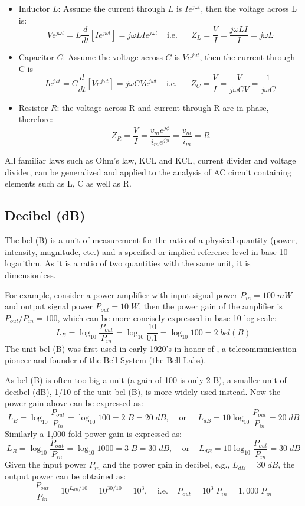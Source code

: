 \begin{itemize}
\item Inductor $L$: Assume the current through $L$ is $I e^{j\omega t}$, 
  then the voltage across L is:
  \[ V e^{j\omega t}=L\frac{d}{dt} [I e^{j\omega t}]=j\omega L I e^{j\omega t}
  \;\;\;\;\mbox{i.e.}\;\;\;\;\;\;Z_L=\frac{V}{I}=\frac{j\omega LI}{I}=j\omega L \]
\item Capacitor $C$: Assume the voltage across $C$ is $V e^{j\omega t}$, 
  then the current through C is
  \[ I e^{j\omega t}=C\frac{d}{dt} [V e^{j\omega t}]=j\omega C V e^{j\omega t}
  \;\;\;\;\mbox{i.e.}\;\;\;\;\;\;Z_C=\frac{V}{I}=\frac{V}{j\omega CV}=\frac{1}{j\omega C} \]
\item Resistor $R$: the voltage across R and current through R are in phase, therefore:
  \[ Z_R=\frac{V}{I}=\frac{v_me^{j\phi}}{i_me^{j\phi}}=\frac{v_m}{i_m}=R \]
\end{itemize}

All familiar laws such as Ohm's law, KCL and KCL, current divider and voltage
divider, can be generalized and applied to the analysis of AC circuit containing
elements such as L, C as well as R.

\subsection*{Decibel (dB)}

The bel (B) is a unit of measurement for the ratio of a physical quantity 
(power, intensity, magnitude, etc.) and a specified or implied reference 
level in base-10 logarithm. As it is a ratio of two quantities with the same 
unit, it is dimensionless. 

For example, consider a power amplifier with input signal power $P_{in}=100\; mW$ 
and output signal power $P_{out}=10\;W$, then the power gain of the amplifier is 
$P_{out}/P_{in}=100$, which can be more concisely expressed in base-10 log scale:
\[
L_B=\log_{10} \frac{P_{out}}{P_{in}}=\log_{10} \frac{10}{0.1} =\log_{10} 100 =2\; bel(B)
\]
The unit bel (B) was first used in early 1920's in honor of 
,
a telecommunication pioneer and founder of the Bell System (the Bell Labs).

As bel (B) is often too big a unit (a gain of 100 is only 2 B), a smaller
unit of decibel (dB), 1/10 of the unit bel (B), is more widely used instead. 
Now the power gain above can be expressed as:
\[ L_B=\log_{10}\frac{P_{out}}{P_{in}}=\log_{10} 100 =2\;B=20\;dB,
\;\;\;\;\mbox{or}\;\;\;\;\;
L_{dB}=10 \log_{10}\frac{P_{out}}{P_{in}}=20\;dB \]
Similarly a 1,000 fold power gain is expressed as:
\[ 
L_B=\log_{10}\frac{P_{out}}{P_{in}}=\log_{10} 1000 =3\;B=30\;dB,
\;\;\;\;\mbox{or}\;\;\;\;
L_{dB}=10 \log_{10}\frac{P_{out}}{P_{in}}=30\;dB 
\]
Given the input power $P_{in}$ and the power gain in decibel, e.g., 
$L_{dB}=30\;dB$, the output power can be obtained as:
\[
\frac{P_{out}}{P_{in}}=10^{L_{dB}/10}=10^{30/10}=10^3,
\;\;\;\;\mbox{i.e.}\;\;\;\;P_{out} =10^3\;P_{in}=1,000\;P_{in} 
\]

